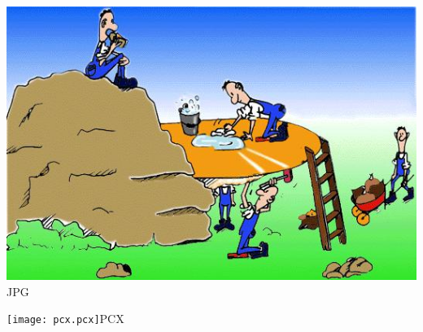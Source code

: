 \documentclass[a4paper]{article}
\begin{document}
\includegraphics[natwidth=25,natheight=65]{hacker.jpg}JPG

\texttt{[image: pcx.pcx]}PCX
\end{document}
